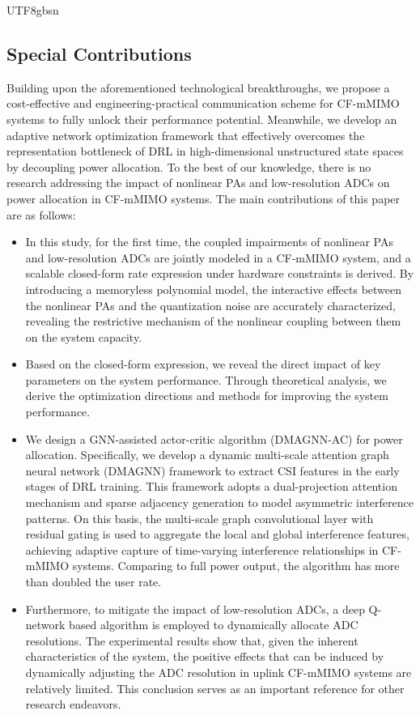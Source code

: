 \documentclass[lettersize,journal]{IEEEtran}
\begin{document}
\begin{CJK}{UTF8}{gbsn}
\subsection{Special Contributions}
Building upon the aforementioned technological breakthroughs, we propose a cost-effective and engineering-practical communication scheme for CF-mMIMO systems to fully unlock their performance potential. Meanwhile, we develop an adaptive network optimization framework that effectively overcomes the representation bottleneck of DRL in high-dimensional unstructured state spaces by decoupling power allocation. To the best of our knowledge, there is no research addressing the impact of nonlinear PAs and low-resolution ADCs on power allocation in CF-mMIMO systems. The main contributions of this paper are as follows:
\begin{itemize}
\item{In this study, for the first time, the coupled impairments of nonlinear PAs and low-resolution ADCs are jointly modeled in a CF-mMIMO system, and a scalable closed-form rate expression under hardware constraints is derived. By introducing a memoryless polynomial model, the interactive effects between the nonlinear PAs and the quantization noise are accurately characterized, revealing the restrictive mechanism of the nonlinear coupling between them on the system capacity.}
\item{Based on the closed-form expression, we reveal the direct impact of key parameters on the system performance. Through theoretical analysis, we derive the optimization directions and methods for improving the system performance.}
\item{We design a GNN-assisted actor-critic algorithm (DMAGNN-AC) for power allocation. Specifically, we develop a dynamic multi-scale attention graph neural network (DMAGNN) framework to extract CSI features in the early stages of DRL training. This framework adopts a dual-projection attention mechanism and sparse adjacency generation to model asymmetric interference patterns. On this basis, the multi-scale graph convolutional layer with residual gating is used to aggregate the local and global interference features, achieving adaptive capture of time-varying interference relationships in CF-mMIMO systems. Comparing to full power output, the algorithm has more than doubled the user rate.}
\item{Furthermore, to mitigate the impact of low-resolution ADCs, a deep Q-network based algorithm is employed to dynamically allocate ADC resolutions. The experimental results show that, given the inherent characteristics of the system, the positive effects that can be induced by dynamically adjusting the ADC resolution in uplink CF-mMIMO systems are relatively limited. This conclusion serves as an important reference for other research endeavors.}
\end{itemize}

\end{CJK}
\end{document}
